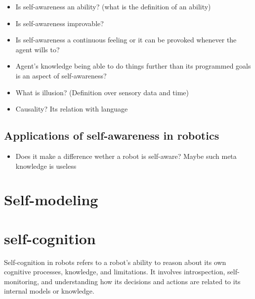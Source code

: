 \begin{itemize}
    \item Is self-awareness an ability? (what is the definition of an ability)
    \item Is self-awareness improvable?
    \item Is self-awareness a continuous feeling or it can be provoked whenever the agent wills to?
    \item Agent's knowledge being able to do things further than its programmed goals is an aspect of self-awareness?
    \item What is illusion? (Definition over sensory data and time)
    \item Causality? Its relation with language
\end{itemize}

\subsection{Applications of self-awareness in robotics}
\begin{itemize}
    \item Does it make a difference wether a robot is self-aware? Maybe such meta knowledge is useless
\end{itemize}


\section{Self-modeling}


\section{self-cognition}
Self-cognition in robots refers to a robot's ability to reason about its own cognitive processes, knowledge, and limitations. It involves introspection, self-monitoring, and understanding how its decisions and actions are related to its internal models or knowledge.

